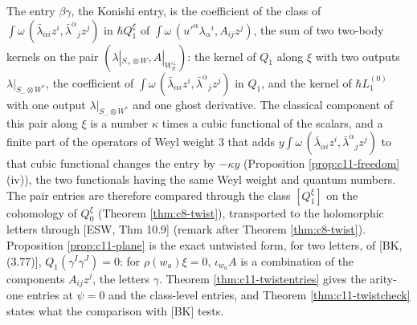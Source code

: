 \begin{remark}
The entry $\beta\gamma$, the Konishi entry, is the coefficient of the class of $\int\omega\,(\bar\lambda_{\dot\alpha i}z^i,\bar\lambda^{\dot\alpha}{}_jz^j)$ in $\hbar Q^\xi_1$ of $\int\omega\,(u'^\alpha\lambda_\alpha{}^i,A_{ij}z^j)$, the sum of two two-body kernels on the pair $(\lambda|_{S_+\otimes W},A|_{W_{\mathbb R}^\perp})$: the kernel of $Q_1$ along $\xi$ with two outputs $\lambda|_{S_-\otimes W^*}$, the coefficient of $\int\omega\,(\bar\lambda_{\dot\alpha i}z^i,\bar\lambda^{\dot\alpha}{}_jz^j)$ in $Q_1$, and the kernel of $\hbar L_1^{(0)}$ with one output $\lambda|_{S_-\otimes W^*}$ and one ghost derivative. The classical component of this pair along $\xi$ is a number $\kappa$ times a cubic functional of the scalars, and a finite part of the operators of Weyl weight $3$ that adds $y\int\omega\,(\bar\lambda_{\dot\alpha i}z^i,\bar\lambda^{\dot\alpha}{}_jz^j)$ to that cubic functional changes the entry by $-\kappa y$ (Proposition \ref{prop:c11-freedom} (iv)), the two functionals having the same Weyl weight and quantum numbers. The pair entries are therefore compared through the class $[Q^\xi_1]$ on the cohomology of $Q^\xi_0$ (Theorem \ref{thm:c8-twist}), transported to the holomorphic letters through [ESW, Thm 10.9] (remark after Theorem \ref{thm:c8-twist}). Proposition \ref{prop:c11-plane} is the exact untwisted form, for two letters, of [BK, (3.77)], $Q_1(\gamma^I\gamma^J)=0$: for $\rho(w_a)\xi=0$, $\iota_{w_a}A$ is a combination of the components $A_{ij}z^j$, the letters $\gamma$. Theorem \ref{thm:c11-twistentries} gives the arity-one entries at $\psi=0$ and the class-level entries, and Theorem \ref{thm:c11-twistcheck} states what the comparison with [BK] tests.
\end{remark}

